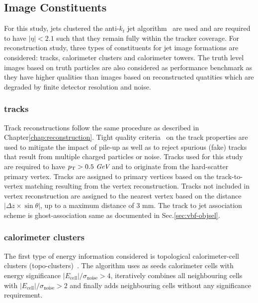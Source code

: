 \label{sec:cnn-image}
\subsection{Image Constituents}
For this study, jets clustered the anti-$k_t$ jet algorithm~\cite{Cacciari:2008gp}
are used and are required to have $|\eta|<2.1$ such that they remain fully within the
tracker coverage.
For reconstruction study, three types of constituents for jet image formations
are considered: tracks, calorimeter clusters and calorimeter towers. The truth level images
based on truth particles are also considered as performance benchmark as they have
higher qualities than images based on reconstructed quatities which are degraded by
finite detector resolution and noise. 

\subsubsection{tracks}
Track reconstructions follow the same procedure as described in Chapter\ref{chap:reconstruction}. Tight quality
criteria~\cite{ATL-PHYS-PUB-2015-051} on the track properties are used to mitigate the impact of pile-up as well as
to reject spurious (fake) tracks that result from multiple charged particles or noise.
Tracks used for this study are required to have $p_\text{T} > 0.5~\textit{GeV}$ and to originate from the hard-scatter primary vertex. 
Tracks are assigned to primary vertices based on the track-to-vertex matching resulting from the vertex reconstruction.
Tracks not included in vertex reconstruction are assigned to the nearest vertex based on the
distance $|\Delta z \times \sin\theta|$, up to a maximum distance of 3 mm.
The track to jet association scheme is ghost-association same as documented in Sec.\ref{sec:vbf-objsel}.


\subsubsection{calorimeter clusters}
The first type of energy information considered is topological calorimeter-cell 
clusters (topo-clusters)~\cite{Aad:2016upy}.
The algorithm uses as seeds calorimeter cells
with energy significance $|E_\text{cell}|/\sigma_\text{noise}>4$,
iteratively combines all neighbouring cells with
$|E_\text{cell}|/\sigma_\text{noise}>2$ and finally adds neighbouring cells
without any significance requirement.


